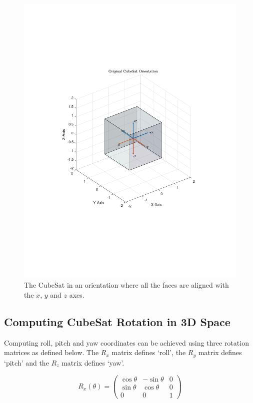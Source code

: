 \documentclass[10pt, letterpaper]{article}
\begin{document}
\begin{figure}[H]
	\centering
	\includegraphics[scale=0.8]{OriginalCubeSat.pdf}
    \caption{The CubeSat in an orientation where all the faces are aligned with the $x$, $y$ and $z$ axes.}
    \label{fig:OriginalCubeSat}
\end{figure}

\subsection{Computing CubeSat Rotation in 3D Space}

Computing roll, pitch and yaw coordinates can be achieved using three rotation matrices as defined below. The $R_{x}$ matrix defines `roll', the $R_{y}$ matrix defines `pitch' and the $R_{z}$ matrix defines `yaw'.


\[
  R_{x}(\theta)=
  \left( {\begin{array}{ccc}
   \cos{\theta} & -\sin{\theta} & 0 \\
   \sin{\theta} & \cos{\theta} & 0 \\
   0 & 0 & 1
  \end{array} } \right)
\]
\end{document}
